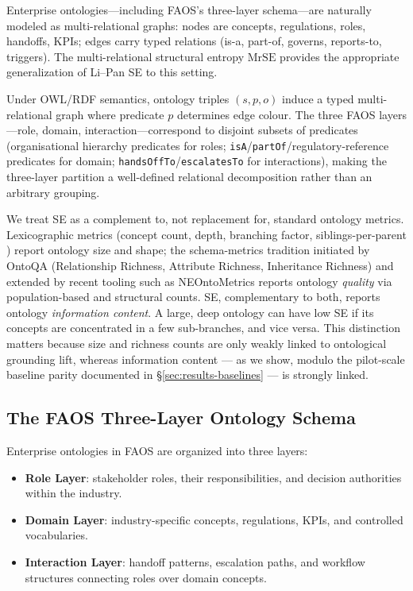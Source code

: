 \documentclass[11pt,a4paper]{article}
\newcommand{\faos}{\textsc{FAOS}}
\newcommand{\mrse}{\mathrm{MrSE}}
\begin{document}
Enterprise ontologies---including \faos{}'s three-layer schema---are
naturally modeled as multi-relational graphs: nodes are concepts,
regulations, roles, handoffs, KPIs; edges carry typed relations
(is-a, part-of, governs, reports-to, triggers). The multi-relational
structural entropy $\mrse$ \citep{cao2024mrse} provides the appropriate
generalization of Li--Pan SE to this setting.

Under OWL/RDF semantics, ontology triples $(s, p, o)$ induce a typed
multi-relational graph where predicate $p$ determines edge colour. The
three \faos{} layers---role, domain, interaction---correspond to
disjoint subsets of predicates (organisational hierarchy predicates for
roles; \texttt{isA}/\texttt{partOf}/regulatory-reference predicates for
domain; \texttt{handsOffTo}/\texttt{escalatesTo} for interactions),
making the three-layer partition a well-defined relational
decomposition rather than an arbitrary grouping.

We treat SE as a complement to, not replacement for, standard ontology
metrics. Lexicographic metrics (concept count, depth, branching factor,
siblings-per-parent \citep{hogan2021knowledge}) report ontology size and
shape; the schema-metrics tradition initiated by OntoQA
\citep{tartir2005ontoqa} (Relationship Richness, Attribute Richness,
Inheritance Richness) and extended by recent tooling such as
NEOntoMetrics \citep{reiz2024neontometrics} reports ontology
\emph{quality} via population-based and structural counts. SE,
complementary to both, reports ontology \emph{information content}.
A large, deep ontology can have low SE if its concepts are concentrated
in a few sub-branches, and vice versa. This distinction matters because
size and richness counts are only weakly linked to ontological
grounding lift, whereas information content --- as we show, modulo the
pilot-scale baseline parity documented in
\S\ref{sec:results-baselines} --- is strongly linked.

\subsection{The \faos{} Three-Layer Ontology Schema}

Enterprise ontologies in \faos{} are organized into three layers:

\begin{itemize}[leftmargin=2em]
  \item \textbf{Role Layer}: stakeholder roles, their responsibilities,
    and decision authorities within the industry.
  \item \textbf{Domain Layer}: industry-specific concepts, regulations,
    KPIs, and controlled vocabularies.
  \item \textbf{Interaction Layer}: handoff patterns, escalation paths,
    and workflow structures connecting roles over domain concepts.
\end{itemize}
\end{document}

